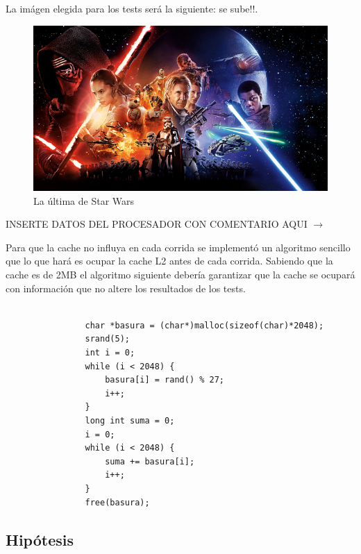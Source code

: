 La imágen elegida para los tests será la siguiente: se sube!!.

\begin{figure}
  \begin{center}
	\includegraphics[scale=0.10]{imagenes/starWars.jpg}
	\caption{La última de Star Wars}
	\label{starwars}
  \end{center}
\end{figure}


INSERTE DATOS DEL PROCESADOR CON COMENTARIO AQUI $\rightarrow$

Para que la cache no influya en cada corrida se implementó un algoritmo sencillo que lo que hará es ocupar la cache L2 antes de cada corrida. Sabiendo que la cache es de 2MB el algoritmo siguiente debería garantizar que la cache se ocupará con información que no altere los resultados de los tests. \\

\begin{codesnippet}
\begin{verbatim}

                char *basura = (char*)malloc(sizeof(char)*2048);
                srand(5);
                int i = 0;
                while (i < 2048) {
                    basura[i] = rand() % 27;            
                    i++;                
                }
                long int suma = 0;
                i = 0;                
                while (i < 2048) {
                    suma += basura[i];   
                    i++;         
                }
                free(basura);

\end{verbatim}
\end{codesnippet}

\pagebreak

\subsection{Hipótesis}


